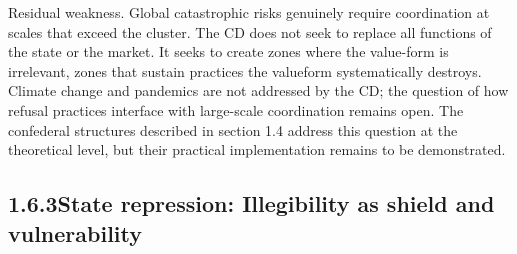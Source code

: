 Residual weakness. Global catastrophic risks genuinely require coordination at scales that exceed the cluster. The CD does not seek to replace all functions of the state or the market. It seeks to create zones where the value-form is irrelevant, zones that sustain practices the valueform systematically destroys. Climate change and pandemics are not addressed by the CD; the question of how refusal practices interface with large-scale coordination remains open. The confederal structures described in section 1.4 address this question at the theoretical level, but their practical implementation remains to be demonstrated.

\subsection{1.6.3\quad State repression: Illegibility as shield and vulnerability}

